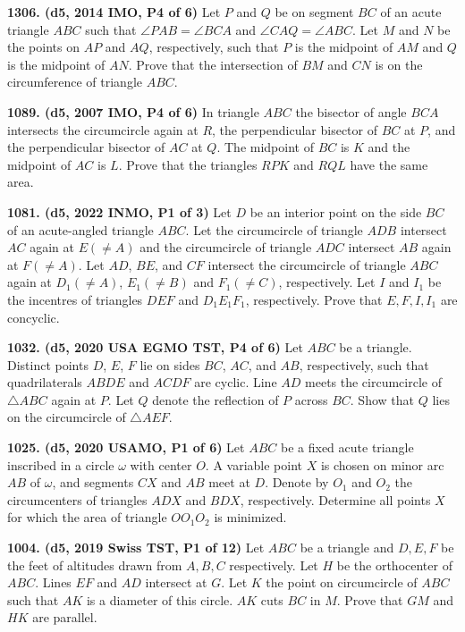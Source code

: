 \documentclass{article}
\begin{document}
\textbf{1306. (\color{red}d5\color{black}, 2014 IMO, P4 of 6)} Let $P$ and $Q$ be on segment $BC$ of an acute triangle $ABC$ such that $\angle PAB=\angle BCA$ and $\angle CAQ=\angle ABC$. Let $M$ and $N$ be the points on $AP$ and $AQ$, respectively, such that $P$ is the midpoint of $AM$ and $Q$ is the midpoint of $AN$. Prove that the intersection of $BM$ and $CN$ is on the circumference of triangle $ABC$.

\textbf{1089. (\color{red}d5\color{black}, 2007 IMO, P4 of 6)} In triangle $ ABC$ the bisector of angle $ BCA$ intersects the circumcircle again at $ R$, the perpendicular bisector of $ BC$ at $ P$, and the perpendicular bisector of $ AC$ at $ Q$. The midpoint of $ BC$ is $ K$ and the midpoint of $ AC$ is $ L$. Prove that the triangles $ RPK$ and $ RQL$ have the same area.

\textbf{1081. (\color{red}d5\color{black}, 2022 INMO, P1 of 3)} Let $D$ be an interior point on the side $BC$ of an acute-angled triangle $ABC$. Let the circumcircle of triangle $ADB$ intersect $AC$ again at $E(\ne A)$ and the circumcircle of triangle $ADC$ intersect $AB$ again at $F(\ne A)$. Let $AD$, $BE$, and $CF$ intersect the circumcircle of triangle $ABC$ again at $D_1(\ne A)$, $E_1(\ne B)$ and $F_1(\ne C)$, respectively. Let $I$ and $I_1$ be the incentres of triangles $DEF$ and $D_1E_1F_1$, respectively. Prove that $E,F, I, I_1$ are concyclic.

\textbf{1032. (\color{red}d5\color{black}, 2020 USA EGMO TST, P4 of 6)} Let $ABC$ be a triangle. Distinct points $D$, $E$, $F$ lie on sides $BC$, $AC$, and $AB$, respectively, such that quadrilaterals $ABDE$ and $ACDF$ are cyclic. Line $AD$ meets the circumcircle of $\triangle ABC$ again at $P$. Let $Q$ denote the reflection of $P$ across $BC$. Show that $Q$ lies on the circumcircle of $\triangle AEF$.

\textbf{1025. (\color{red}d5\color{black}, 2020 USAMO, P1 of 6)} Let $ABC$ be a fixed acute triangle inscribed in a circle $\omega$ with center $O$. A variable point $X$ is chosen on minor arc $AB$ of $\omega$, and segments $CX$ and $AB$ meet at $D$. Denote by $O_1$ and $O_2$ the circumcenters of triangles $ADX$ and $BDX$, respectively. Determine all points $X$ for which the area of triangle $OO_1O_2$ is minimized.

\textbf{1004. (\color{red}d5\color{black}, 2019 Swiss TST, P1 of 12)} Let $ABC$ be a triangle and $D, E, F$ be the feet of altitudes drawn from $A,B,C$ respectively. Let $H$ be the orthocenter of $ABC$. Lines $EF$ and $AD$ intersect at $G$. Let $K$ the point on circumcircle of $ABC$ such that $AK$ is a diameter of this circle. $AK$ cuts $BC$ in $M$. Prove that $GM$ and $HK$ are parallel.
\end{document}
